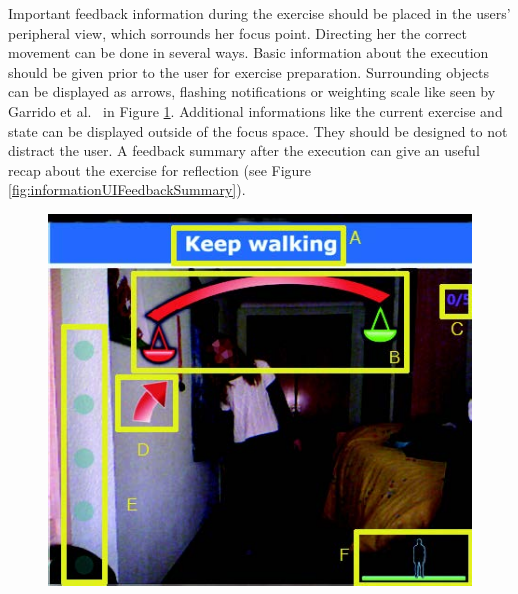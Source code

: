Important feedback information during the exercise should be placed in the users' peripheral view, which sorrounds her focus point. Directing her the correct movement can be done in several ways. Basic information about the execution should be given prior to the user for exercise preparation. Surrounding objects can be displayed as arrows, flashing notifications or weighting scale like seen by Garrido et al.~\cite{Garrido2013-zs} in Figure \ref{fig:informationUISurroundingObjects}. 
Additional informations like the current exercise and state can be displayed outside of the focus space. They should be designed to not distract the user. A feedback summary after the execution can give an useful recap about the exercise for reflection (see Figure \ref{fig:informationUIFeedbackSummary}).
\begin{figure}[htb]
	\centering
	\begin{minipage}[t]{0.41\linewidth}
		\centering
		\includegraphics[width=1\linewidth]{Pictures/informationUISurroundingObjects}
		\label{fig:informationUISurroundingObjects}
	\end{minipage}
	\hfill
	\begin{minipage}[t]{0.41\linewidth}
		\centering

\end{minipage}
\end{figure}
